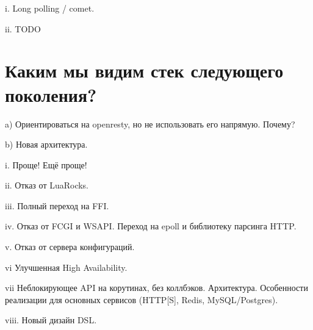 \documentclass[handout]{beamer}
\begin{document}
\begin{frame}
i. Long polling / comet.
\end{frame}

\begin{frame}
ii. TODO
\end{frame}


\section{Каким мы видим стек следующего поколения?}

\begin{frame}
a) Ориентироваться на openresty, но не использовать его напрямую. Почему?
\end{frame}

\begin{frame}
b) Новая архитектура.
\end{frame}

\begin{frame}
i. Проще! Ещё проще!
\end{frame}

\begin{frame}
ii. Отказ от LuaRocks.
\end{frame}

\begin{frame}
iii. Полный переход на FFI.
\end{frame}

\begin{frame}
iv. Отказ от FCGI и WSAPI. Переход на epoll и библиотеку парсинга HTTP.
\end{frame}

\begin{frame}
v. Отказ от сервера конфигураций.
\end{frame}

\begin{frame}
vi Улучшенная High Availability.
\end{frame}

\begin{frame}
vii Неблокирующее API на корутинах, без коллбэков. Архитектура. Особенности реализации для основных сервисов (HTTP[S], Redis, MySQL/Postgres).
\end{frame}

\begin{frame}
viii. Новый дизайн DSL.
\end{frame}
\end{document}
